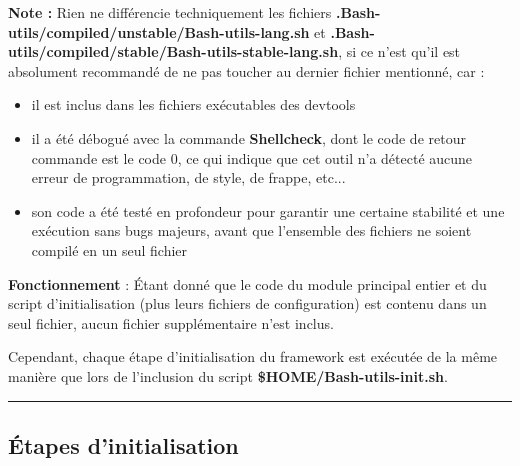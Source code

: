 \documentclass[a4paper,10pt]{article}
\begin{document}
\begin{justify}
    \textbf{Note :} Rien ne différencie techniquement les fichiers \textbf{\color{path}.Bash-utils/compiled/unstable/Bash-utils-lang.sh} et \textbf{\color{path}.Bash-utils/compiled/stable/Bash-utils-stable-lang.sh}, si ce n'est qu'il est absolument recommandé de ne pas toucher au dernier fichier mentionné, car :\\\mbox{}
    \begin{itemize}
        \item il est inclus dans les fichiers exécutables des devtools\\\mbox{}

        \item il a été débogué avec la commande \textbf{\color{cmds}Shellcheck}, dont le code de retour commande est le code 0, ce qui indique que cet outil n'a détecté aucune erreur de programmation, de style, de frappe, etc...\\\mbox{}

        \item son code a été testé en profondeur pour garantir une certaine stabilité et une exécution sans bugs majeurs, avant que l'ensemble des fichiers ne soient compilé en un seul fichier
    \end{itemize}
\end{justify}

\begin{justify}
    \textbf{Fonctionnement} : Étant donné que le code du module principal entier et du script d'initialisation (plus leurs fichiers de configuration) est contenu dans un seul fichier, aucun fichier supplémentaire n'est inclus.
\end{justify}

\begin{justify}
    Cependant, chaque étape d'initialisation du framework est exécutée de la même manière que lors de l'inclusion du script \textbf{\color{vars}\$HOME/\color{path}Bash-utils-init.sh}.
\end{justify}




\color{sec2}\par\noindent\rule{\textwidth}{0.4pt}\color{text}

\color{sec2}
\subsection{Étapes d'initialisation}\color{text}
\end{document}
